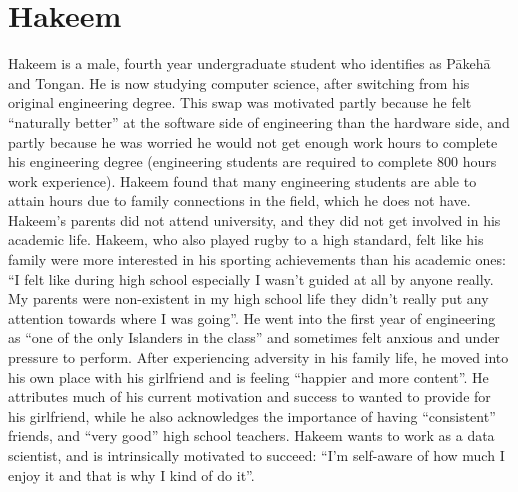 \section{Hakeem}
Hakeem is a male, fourth year undergraduate student who identifies as P\={a}keh\={a} and Tongan. He is now studying computer science, after switching from his original engineering degree. This swap was motivated partly because he felt ``naturally better'' at the software side of engineering than the hardware side, and partly because he was worried he would not get enough work hours to complete his engineering degree (engineering students are required to complete 800 hours work experience). Hakeem found that many engineering students are able to attain hours due to family connections in the field, which he does not have. Hakeem's parents did not attend university, and they did not get involved in his academic life. Hakeem, who also played rugby to a high standard, felt like his family were more interested in his sporting achievements than his academic ones: ``I felt like during high school especially I wasn't guided at all by anyone really. My parents were non-existent in my high school life they didn't really put any attention towards where I was going''. He went into the first year of engineering as ``one of the only Islanders in the class'' and sometimes felt anxious and under pressure to perform. After experiencing adversity in his family life, he moved into his own place with his girlfriend and is feeling ``happier and more content''. He attributes much of his current motivation and success to wanted to provide for his girlfriend, while he also acknowledges the importance of having ``consistent'' friends, and ``very good'' high school teachers. Hakeem wants to work as a data scientist, and is intrinsically motivated to succeed: ``I'm self-aware of how much I enjoy it and that is why I kind of do it''.  

